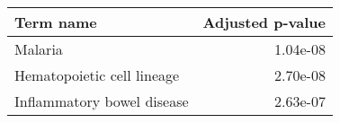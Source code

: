 \begin{tabular}{lr}
\toprule
                 Term name &  Adjusted p-value \\
\midrule
                   Malaria &          1.04e-08 \\
Hematopoietic cell lineage &          2.70e-08 \\
Inflammatory bowel disease &          2.63e-07 \\
\bottomrule
\end{tabular}
